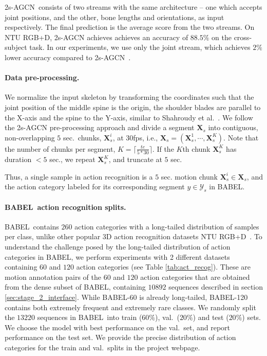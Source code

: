 \documentclass[final]{cvpr}
\def\babel{BABEL}
\def\ntu{NTU RGB+D}
\def\twoSAGCN{2s-AGCN}
\begin{document}
\twoSAGCN~consists of two streams with the same architecture -- one which accepts joint positions, and the other, bone lengths and orientations, as input respectively. The final prediction is the average score from the two streams. 
On \ntu, \twoSAGCN\/ achieves achieves an accuracy of $88.5\%$ on the cross-subject task. 
In our experiments, we use only the joint stream, which achieves $2\%$ lower accuracy compared to \twoSAGCN~\cite{shi2019two}. 

\noindent
\paragraph{Data pre-processing.} 
We normalize the input skeleton by transforming the coordinates such that the joint position of the middle spine is the origin, the shoulder blades are parallel to the X-axis and the spine to the Y-axis, similar to Shahroudy et al.~\cite{DBLP:conf/cvpr/ShahroudyLNW16}. 
We follow the \twoSAGCN\/ pre-processing approach and divide a segment $\mathbf{X}_s$ into contiguous, non-overlapping $5$ sec.~chunks, $\mathbf{X}_s^i$, at $30$fps, i.e., $\mathbf{X}_s = (\mathbf{X}_s^1, \cdots, \mathbf{X}_s^K) $. Note that the number of chunks per segment, $K = \lceil \frac{te}{5*30} \rceil$. 
If the $K$th chunk $\mathbf{X}_s^K$ has duration $< 5$ sec., we repeat $\mathbf{X}_s^K$, and truncate at $5$ sec. 

Thus, a single sample in action recognition is a $5$ sec. motion chunk $\mathbf{X}_s^i \in \mathbf{X}_s$, and the action category labeled for its corresponding segment $y \in \mathcal{Y}_s$ in \babel. 


\noindent
\paragraph{\babel~action recognition splits.} 
\babel~contains $260$ action categories with a long-tailed distribution of samples per class, unlike other popular 3D action recognition datasets \ntu~\cite{DBLP:journals/pami/LiuSPWDK20,DBLP:conf/cvpr/ShahroudyLNW16}. 
To understand the challenge posed by the long-tailed distribution of action categories in \babel, we perform experiments with 2 different datasets containing $60$ and $120$ action categories (see Table \ref{tab:act_recog}). These are motion annotation pairs of the $60$ and $120$ action categories that are obtained from the dense subset of \babel, containing $10892$ sequences described in section \ref{sec:stage_2_interface}.
While \babel-60 is already long-tailed, \babel-120 contains both extremely frequent and extremely rare classes. 
We randomly split the $13220$ sequences in \babel~into train ($60\%$), val.~($20\%$) and test ($20\%$) sets. 
We choose the model with best performance on the val.~set, and report performance on the test set. 
We provide the precise distribution of action categories for the train and val.~splits in the project webpage. 
\end{document}
